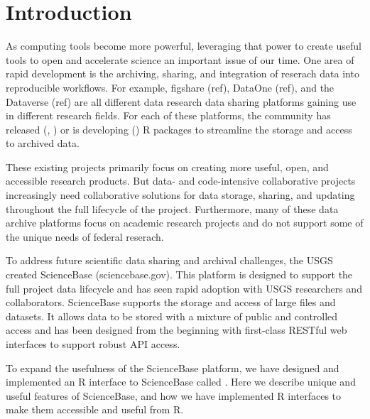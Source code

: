 \section{Introduction}

As computing tools become more powerful, leveraging that power to 
create useful tools to open and accelerate science an important issue 
of our time. One area of rapid development is the archiving, sharing, 
and integration of reserach data into reproducible workflows. For example,
figshare (ref), DataOne (ref), and the Dataverse (ref) are all different data research data
sharing platforms gaining use in different research fields. For each of these 
platforms, the community has released (, ) or is 
developing () R packages to streamline the storage and access
to archived data. 

These existing projects primarily focus on creating more useful, open, and 
accessible research products. But data- and code-intensive collaborative projects 
increasingly need collaborative solutions for data storage, sharing, and updating 
throughout the full lifecycle of the project. Furthermore, many of these data 
archive platforms focus on academic research projects and do not support some 
of the unique needs of federal reserach. 

To address future scientific data sharing and archival challenges, the USGS 
created ScienceBase (sciencebase.gov). This platform is designed to support 
the full project data lifecycle and has seen rapid adoption with USGS 
researchers and collaborators. ScienceBase supports the storage and access 
of large files and datasets. It allows data to be stored with a mixture of 
public and controlled access and has been designed from the beginning with 
first-class RESTful web interfaces to support robust API access. 

To expand the usefulness of the ScienceBase platform, we have designed and 
implemented an R interface to ScienceBase called . Here we 
describe unique and useful features of ScienceBase, and how we have implemented
R interfaces to make them accessible and useful from R. 


